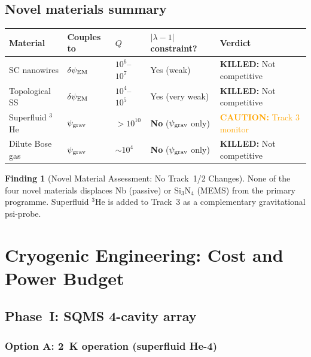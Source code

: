 \documentclass[11pt]{article}
\theoremstyle{definition}
\newtheorem{finding}[theorem]{Finding}
\theoremstyle{remark}
\newcommand{\psigrav}{\psi_{\rm grav}}
\newcommand{\psiEM}{\delta\psi_{\rm EM}}
\newcommand{\lam}{|\lambda-1|}
\newcommand{\caution}[1]{\textcolor{orange}{\textbf{CAUTION:} #1}}
\newcommand{\killed}[1]{\textcolor{red!70!black}{\textbf{KILLED:} #1}}
\begin{document}
\subsection{Novel materials summary}

\begin{center}
\renewcommand{\arraystretch}{1.3}
\begin{tabular}{p{3.5cm}p{2cm}p{2cm}p{2cm}p{3cm}}
\toprule
Material & Couples to & $Q$ & $\lam$ constraint? & Verdict \\
\midrule
SC nanowires & $\psiEM$ & $10^6$--$10^7$ & Yes (weak) &
  \killed{Not competitive} \\
Topological SS & $\psiEM$ & $10^4$--$10^5$ & Yes (very weak) &
  \killed{Not competitive} \\
Superfluid $^3$He & $\psigrav$ & $>10^{10}$ & \textbf{No} ($\psigrav$ only) &
  \caution{Track 3 monitor} \\
Dilute Bose gas & $\psigrav$ & $\sim 10^4$ & \textbf{No} ($\psigrav$ only) &
  \killed{Not competitive} \\
\bottomrule
\end{tabular}
\end{center}

\begin{finding}[Novel Material Assessment: No Track~1/2 Changes]
\label{find:novel_summary}
None of the four novel materials displaces Nb (passive) or Si$_3$N$_4$
(MEMS) from the primary programme. Superfluid $^3$He is added to
Track~3 as a complementary gravitational psi-probe.
\end{finding}


\section{Cryogenic Engineering: Cost and Power Budget}
\label{sec:cryo}

\subsection{Phase~I: SQMS 4-cavity array}

\subsubsection{Option A: 2~K operation (superfluid He-4)}
\end{document}
